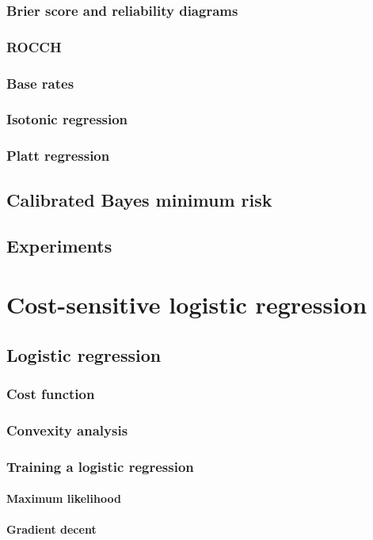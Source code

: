 \documentclass[twoside,openright,titlepage,numbers=noenddot,headinclude,%
               footinclude=true,cleardoublepage=empty,abstractoff,BCOR=5mm,%
               paper=a4,fontsize=11pt,ngerman,american,doublespace]{scrreprt}
\numberwithin{theorem}{chapter}
\numberwithin{definition}{chapter}
\numberwithin{algorithm}{chapter}
\numberwithin{figure}{chapter}
\numberwithin{table}{chapter}
\numberwithin{equation}{chapter}
\begin{document}
			\subsection{Brier score and reliability diagrams}
			\subsection{ROCCH}
			\subsection{Base rates}
			\subsection{Isotonic regression}
			\subsection{Platt regression}
		\section{Calibrated Bayes minimum risk}
		\section{Experiments}
		
	\chapter{Cost-sensitive logistic regression}
		\section{Logistic regression}
			\subsection{Cost function}
				\subsection{Convexity analysis}
			\subsection{Training a logistic regression}
				\subsubsection{Maximum likelihood}
				\subsubsection{Gradient decent}
\end{document}
